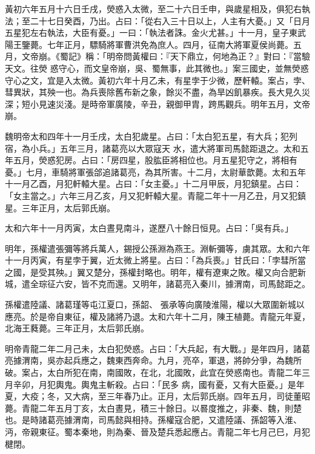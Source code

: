 \begin{pinyinscope}
 黃初六年五月十六日壬戌，熒惑入太微，至二十六日壬申，與歲星相及，俱犯右執法；至二十七日癸酉，乃出。占曰：「從右入三十日以上，人主有大憂。」又「日月五星犯左右執法，大臣有憂。」一曰：「執法者誅。金火尤甚。」十一月，皇子東武陽王鑒薨。七年正月，驃騎將軍曹洪免為庶人。四月，征南大將軍夏侯尚薨。五月，文帝崩。《蜀記》稱：「明帝問黃權曰：『天下鼎立，何地為正？』對曰：『當驗天文。往熒
 惑守心，而文皇帝崩，吳、蜀無事，此其微也。」案三國史，並無熒惑守心之文，宜是入太微。黃初六年十月乙未，有星孛于少微，歷軒轅。案占，孛、彗異狀，其殃一也。為兵喪除舊布新之象，餘災不盡，為旱凶飢暴疾。長大見久災深；短小見速災淺。是時帝軍廣陵，辛丑，親御甲胄，跨馬觀兵。明年五月，文帝崩。



 魏明帝太和四年十一月壬戌，太白犯歲星。占曰：「太白犯五星，有大兵；犯列宿，為小兵。」五年三月，諸葛亮以大眾寇天
 水，遣大將軍司馬懿距退之。太和五年五月，熒惑犯房。占曰：「房四星，股肱臣將相位也。月五星犯守之，將相有憂。」七月，車騎將軍張郃追諸葛亮，為其所害。十二月，太尉華歆薨。太和五年十一月乙酉，月犯軒轅大星。占曰：「女主憂。」十二月甲辰，月犯鎮星。占曰：「女主當之。」六年三月乙亥，月又犯軒轅大星。青龍二年十一月乙丑，月又犯鎮星。三年正月，太后郭氏崩。



 太和六年十一月丙寅，太白晝見南斗，遂歷八十餘日恒見。占曰：「吳有兵。」



 明年，孫權遣張彌等將兵萬人，錫授公孫淵為燕王。淵斬彌等，虜其眾。太和六年十一月丙寅，有星孛于翼，近太微上將星。占曰：「為兵喪。」甘氏曰：「孛彗所當之國，是受其殃。」翼又楚分，孫權封略也。明年，權有遼東之敗。權又向合肥新城，遣全琮征六安，皆不克而還。又明年，諸葛亮入秦川，據渭南，司馬懿距之。



 孫權遣陸議、諸葛瑾等屯江夏口，孫韶、
 張承等向廣陵淮陽，權以大眾圍新城以應亮。於是帝自東征，權及諸將乃退。太和六年十二月，陳王植薨。青龍元年夏，北海王蕤薨。三年正月，太后郭氏崩。



 明帝青龍二年二月己未，太白犯熒惑。占曰：「大兵起，有大戰。」是年四月，諸葛亮據渭南，吳亦起兵應之，魏東西奔命。九月，亮卒，軍退，將帥分爭，為魏所破。案占，太白所犯在南，南國敗，在北，北國敗，此宜在熒惑南也。青龍二年三月辛卯，月犯輿鬼。輿鬼主斬殺。占曰：「民多
 病，國有憂，又有大臣憂。」是年夏，大疫；冬，又大病，至三年春乃止。正月，太后郭氏崩。四年五月，司徒董昭薨。青龍二年五月丁亥，太白晝見，積三十餘日。以晷度推之，非秦、魏，則楚也。是時諸葛亮據渭南，司馬懿與相持。孫權寇合肥，又遣陸議、孫韶等入淮、沔，帝親東征。蜀本秦地，則為秦、晉及楚兵悉起應占。青龍二年七月己巳，月犯楗閉。




\end{pinyinscope}
